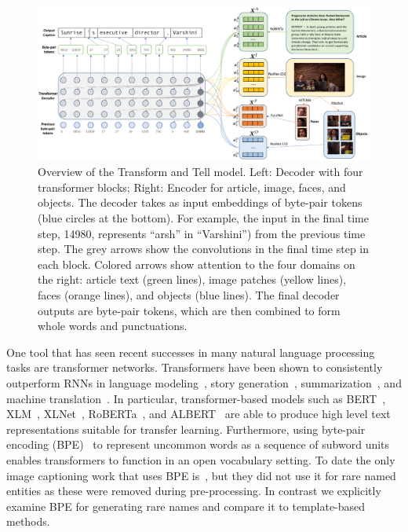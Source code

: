 \begin{figure}[t]
   \begin{center}
      \includegraphics[width=\linewidth]{figures/figure_2.pdf}
   \end{center}

   \capmoveup
   \caption{Overview of the Transform and Tell model. Left: Decoder with four
      transformer blocks; Right: Encoder for article, image, faces, and
      objects. The decoder takes as input embeddings of byte-pair tokens (blue
      circles at the bottom). For example, the input in the final time step,
      14980, represents ``arsh'' in ``Varshini'') from the previous time step.
      The grey arrows show the convolutions in the final time step in each
      block. Colored arrows show attention to the four domains on the right:
      article text (green lines), image patches (yellow lines), faces (orange
      lines), and objects (blue lines). The final decoder outputs are byte-pair
      tokens, which are then combined to form whole words and punctuations.}
   \postfigmoveup
   \label{fig:model}
\end{figure}

One tool that has seen recent successes in many natural language processing
tasks are transformer networks. Transformers have been shown to consistently
outperform RNNs in language modeling~\cite{Radford2019LanguageMA},
story generation~\cite{Fan2018HierarchicalNS},
summarization~\cite{Subramanian2019OnEA}, and machine
translation~\cite{Bojar2018Findings}. In particular, transformer-based models
such as BERT~\cite{Devlin2019BERT}, XLM~\cite{Lample2019CrosslingualLM},
XLNet~\cite{Yang2019XLNetGA}, RoBERTa~\cite{Liu2019RoBERTaAR}, and
ALBERT~\cite{Lan2019ALBERT} are able to produce high level text representations
suitable for transfer learning. Furthermore, using byte-pair encoding
(BPE)~\cite{Sennrich2015NeuralMT} to represent uncommon words as a sequence of
subword units enables transformers to function in an open vocabulary setting.
To date the only image captioning work that uses BPE
is~\cite{Zhao2019InformativeIC}, but they did not use it for rare named
entities as these were removed during pre-processing. In contrast we explicitly
examine BPE for generating rare names and compare it to template-based methods.

